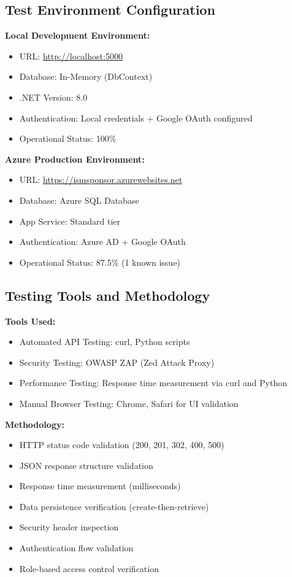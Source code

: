 \subsection{Test Environment Configuration}

\textbf{Local Development Environment:}
\begin{itemize}
    \item URL: \url{http://localhost:5000}
    \item Database: In-Memory (DbContext)
    \item .NET Version: 8.0
    \item Authentication: Local credentials + Google OAuth configured
    \item Operational Status: 100\%
\end{itemize}

\textbf{Azure Production Environment:}
\begin{itemize}
    \item URL: \url{https://ismsponsor.azurewebsites.net}
    \item Database: Azure SQL Database
    \item App Service: Standard tier
    \item Authentication: Azure AD + Google OAuth
    \item Operational Status: 87.5\% (1 known issue)
\end{itemize}

\subsection{Testing Tools and Methodology}

\textbf{Tools Used:}
\begin{itemize}
    \item Automated API Testing: curl, Python scripts
    \item Security Testing: OWASP ZAP (Zed Attack Proxy)
    \item Performance Testing: Response time measurement via curl and Python
    \item Manual Browser Testing: Chrome, Safari for UI validation
\end{itemize}

\textbf{Methodology:}
\begin{itemize}
    \item HTTP status code validation (200, 201, 302, 400, 500)
    \item JSON response structure validation
    \item Response time measurement (milliseconds)
    \item Data persistence verification (create-then-retrieve)
    \item Security header inspection
    \item Authentication flow validation
    \item Role-based access control verification
\end{itemize}

